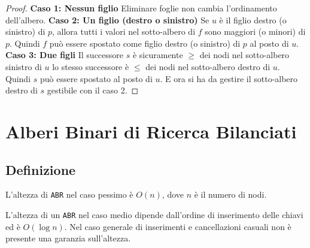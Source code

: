             \begin{proof}
                \textbf{Caso 1: Nessun figlio} Eliminare foglie non cambia l'ordinamento dell'albero.\newline
                \textbf{Caso 2: Un figlio (destro o sinistro)} Se $ u $ è il figlio destro (o sinistro) di $ p $, allora tutti i valori nel sotto-albero di $ f $ sono maggiori (o minori) di $ p $. Quindi $f$ può essere spostato come figlio destro (o sinistro) di $ p $ al posto di $ u $.\newline
                \textbf{Caso 3: Due figli} Il successore $ s $ è sicuramente $\geq$ dei nodi nel sotto-albero sinistro di $ u $ lo stesso successore è $\leq$ dei nodi nel sotto-albero destro di $ u $. Quindi $ s $ può essere spostato al posto di $ u $. E ora si ha da gestire il sotto-albero destro di $ s $ gestibile con il caso 2.
            \end{proof}
\section{Alberi Binari di Ricerca Bilanciati}
    \subsection{Definizione}
        \begin{definition}
            L'altezza di \texttt{ABR} nel caso pessimo è $O(n)$, dove $n$ è il numero di nodi.
        \end{definition}
        \begin{definition}
            L'altezza di un \texttt{ABR} nel caso medio dipende dall'ordine di inserimento delle chiavi ed è $O(\log n)$. Nel caso generale di inserimenti e cancellazioni casuali non è presente una garanzia sull'altezza.
        \end{definition}

